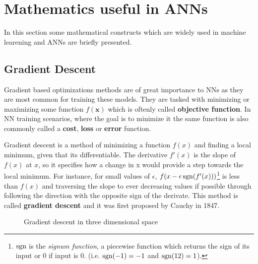 \section{Mathematics useful in ANNs}

In this section some mathematical constructs which are widely
used in machine learening and ANNs are briefly presented.

\subsection{Gradient Descent}\label{sec:gradient_descent}

Gradient based optimizations methods are of great importance to
NNs as they are most common for training these models. They
are tasked with minimizing or maximizing some function $f(\bm{x})$ which
is oftenly called \textbf{objective function}. In NN training
scenarios, where the goal is to minimize it the same function is also
commonly called a \textbf{cost}, \textbf{loss} or \textbf{error}
function\cite{book:Goodfellow}.

Gradient descent is a method of minimizing a function $f(x)$ and
finding a local minimum, given that its differentiable. The
derivative $f'(x)$ is the slope of $f(x)$ at $x$, so it specifies
how a change in x would provide a step towards the local minimum. For instance,
for small values of $\epsilon$, $f(x - \epsilon \operatorname{sgn} (f'(x)))$\footnote{
  $\operatorname{sgn}$ is the \textit{signum function}, a piecewise function which returns
  the sign of its input or 0 if input is 0. (i.e. $\operatorname{sgn}(-1) = -1$ and $\operatorname{sgn}(12) = 1$).
} is less than $f(x)$ and traversing the slope to ever decreasing
values if possible through following the direction with the opposite
sign of the derivate. This method is called \textbf{gradient descent}
and it was first proposed by Cauchy \cite{article:Cauchy} in 1847.
\begin{figure}[h!]
  \centering
  
  \caption{Gradient descent in three dimensional space}
  \label{fig:gradient_descent_2d}
\end{figure}

